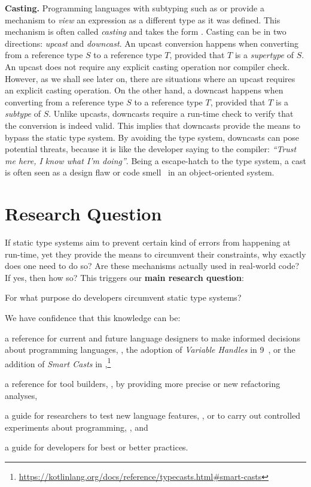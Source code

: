 \textbf{Casting.}
Programming languages with subtyping such as \java{} or \cpp{} provide a mechanism to \emph{view} an expression as a different type as it was defined.
This mechanism is often called \emph{casting} and takes the form .
Casting can be in two directions: \emph{upcast} and \emph{downcast}.
An upcast conversion happens when converting from a reference type $S$ to a reference type $T$, provided that $T$ is a \emph{supertype} of $S$.
An upcast does not require any explicit casting operation nor compiler check.
However, as we shall see later on, there are situations where an upcast requires an explicit casting operation.
On the other hand, a downcast happens when converting from a reference type $S$ to a reference type $T$, provided that $T$ is a \emph{subtype} of $S$.
Unlike upcasts, downcasts require a run-time check to verify that the conversion is indeed valid.
This implies that downcasts provide the means to bypass the static type system.
By avoiding the type system, downcasts can pose potential threats, because it is like the developer saying to the compiler: \emph{``Trust me here, I know what I'm doing''}.
Being a escape-hatch to the type system,
a cast is often seen as a design flaw or code smell~\citep{tufanoWhenWhyYour2015} in an object-oriented system.


\section{Research Question}

If static type systems aim to prevent certain kind of errors from happening at run-time,
yet they provide the means to circumvent their constraints,
why exactly does one need to do so?
Are these mechanisms actually used in real-world code?
If yes, then how so?
This triggers our \textbf{main research question}:

\begin{mdframed}

\centering
For what purpose do developers circumvent static type systems?
\end{mdframed}

We have confidence that this knowledge can be:
\begin{inparaenum}[a)]
\item a reference for current and future language designers
to make informed decisions about programming languages,
\eg{}, the adoption of \emph{Variable Handles} in \java{} 9~\citep{jep193},
or the addition of \emph{Smart Casts} in ,\footnote{\url{https://kotlinlang.org/docs/reference/typecasts.html\#smart-casts}}
\item a reference for tool builders, \eg{}, by providing more precise or new refactoring analyses,
\item a guide for researchers to test new language features, \eg{}, \cite{wintherGuardedTypePromotion2011} or to carry out controlled experiments about programming, \eg{}, \cite{stuchlikStaticVsDynamic2011} and
\item a guide for developers for best or better practices.
\end{inparaenum}


